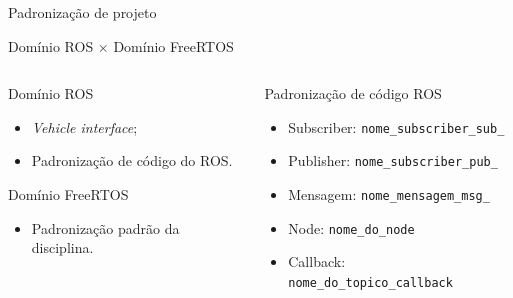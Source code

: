 \documentclass{if-beamer}
\begin{document}
\begin{frame}{Padronização de projeto}
	
	\begin{block}{}
		\centering
		\vspace{1mm}
		Domínio ROS $\times$ Domínio FreeRTOS
		\vspace{1mm}
		
	\end{block}
	
	\pause
	
	\begin{columns}
		
		\begin{column}{0.42\textwidth}
			
			\begin{block}{Domínio ROS}
				
				\begin{itemize}
					\item \textit{Vehicle interface};
					\item Padronização de código do ROS.
				\end{itemize}
				
			\end{block}
			
			\pause
		
			\begin{block}{Domínio FreeRTOS}
			
				\begin{itemize}
					\item Padronização padrão da disciplina.
				\end{itemize}
			
			\end{block}
			
			\pause
			
		\end{column}
		
		\begin{column}{0.45\textwidth}
			
			\begin{block}{Padronização de código ROS}
				
				\begin{itemize}
					\item Subscriber: \texttt{nome\_subscriber\_sub\_}
					\item Publisher: \texttt{nome\_subscriber\_pub\_}
					\item Mensagem: \texttt{nome\_mensagem\_msg\_}
					\item Node: \texttt{nome\_do\_node}
					\item Callback: \texttt{nome\_do\_topico\_callback}
					

\end{itemize}
\end{block}
\end{column}
\end{columns}
\end{frame}
\end{document}
